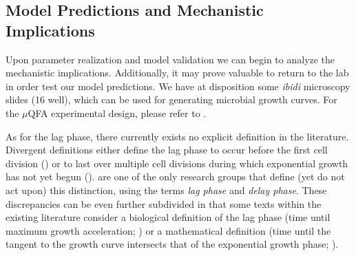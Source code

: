 \documentclass{bioinfo}
\begin{document}
\vspace{-1em}
\subsection{Model Predictions and Mechanistic Implications}

Upon parameter realization and model validation we can begin to analyze the mechanistic implications. Additionally, it may prove valuable to return to the lab in order test our model predictions. We have at disposition some \textit{ibidi} microscopy slides (16 well), which can be used for generating microbial growth curves. For the $\mu$QFA experimental design, please refer to \citealp{Lawless12}. 

As for the lag phase, there currently exists no explicit definition in the literature. Divergent definitions either define the lag phase to occur before the first cell division (\citealp{Baty04}) or to last over multiple cell divisions during which exponential growth has not yet begun (\citealp{Pin06}). \citealp{Rolfe12} are one of the only research groups that define (yet do not act upon) this distinction, using the terms \textit{lag phase} and \textit{delay phase}. These discrepancies can be even further subdivided in that some texts within the existing literature consider a biological definition of the lag phase (time until maximum growth acceleration; \citealp{Buchanan90}) or a mathematical definition (time until the tangent to the growth curve intersects that of the exponential growth phase; \citealp{Baranyi02}). 
\end{document}

